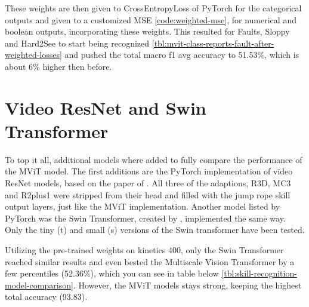 These weights are then given to CrossEntropyLoss of PyTorch for the categorical outputs and given to a customized MSE \ref{code:weighted-mse}, for numerical and boolean outputs, incorporating these weights.
This resulted for Faults, Sloppy and Hard2See to start being recognized \ref{tbl:mvit-class-reports-fault-after-weighted-losses} and pushed the total macro f1 avg accuracy to 51.53\%, which is about 6\% higher then before.

\section{Video ResNet and Swin Transformer}
\label{results:skill-recognition-resnet-swin-saconv3d}

To top it all, additional models where added to fully compare the performance of the MViT model.
The first additions are the PyTorch implementation of video ResNet models, based on the paper of \textcite{Tran2017}.
All three of the adaptions, R3D, MC3 and R2plus1 were stripped from their head and filled with the jump rope skill output layers, just like the MViT implementation. Another model listed by PyTorch was the Swin Transformer, created by \textcite{Liu2021}, implemented the same way. Only the tiny (t) and small (s) versions of the Swin transformer have been tested.

Utilizing the pre-trained weights on kinetics 400, only the Swin Transformer reached similar results and even bested the Multiscale Vision Transformer by a few percentiles (52.36\%), which you can see in table below \ref{tbl:skill-recognition-model-comparison}.
However, the MViT models stays strong, keeping the highest total accuracy (93.83).

